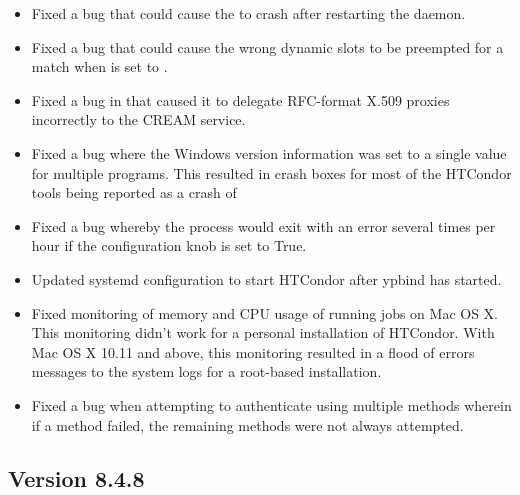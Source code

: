 \begin{itemize}

\item Fixed a bug that could cause the  to crash after
restarting the  daemon.

\item Fixed a bug that could cause the wrong dynamic slots to be preempted
for a match when  is set to .

\item Fixed a bug in  that caused it to delegate
RFC-format X.509 proxies incorrectly to the CREAM service.

\item Fixed a bug where the Windows version information was set to
a single value for multiple programs.
This resulted in crash boxes for most of the HTCondor tools being reported
as a crash of 

\item Fixed a bug whereby the  process would exit with
an error several times per hour if the configuration knob 
is set to True.

\item Updated systemd configuration to start HTCondor after ypbind has
started.

\item Fixed monitoring of memory and CPU usage of running jobs on Mac OS X.
This monitoring didn't work for a personal installation of HTCondor.
With Mac OS X 10.11 and above, this monitoring resulted in a flood of
errors messages to the system logs for a root-based installation.

\item Fixed a bug when attempting to authenticate using multiple
methods wherein if a method failed, the remaining methods were not
always attempted.

\end{itemize}

\subsection*{\label{sec:New-8-4-8}Version 8.4.8}

